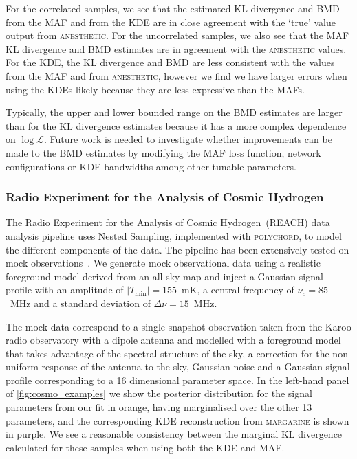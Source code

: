 For the correlated samples, we see that the estimated KL divergence and BMD from the MAF and from the KDE are in close agreement with the `true' value output from \textsc{anesthetic}.
For the uncorrelated samples, we also see that the MAF KL divergence and BMD estimates are in agreement with the \textsc{anesthetic} values. For the KDE, the KL divergence and BMD are less consistent with the values from the MAF and from \textsc{anesthetic}, however we find we have larger errors when using the KDEs likely because they are less expressive than the MAFs. 

Typically, the upper and lower bounded range on the BMD estimates are larger than for the KL divergence estimates because it has a more complex dependence on $\log\mathcal{L}$. Future work is needed to investigate whether improvements can be made to the BMD estimates by modifying the MAF loss function, network configurations or KDE bandwidths among other tunable parameters.

\subsubsection{Radio Experiment for the Analysis of Cosmic Hydrogen}


The Radio Experiment for the Analysis of Cosmic Hydrogen~(REACH)  data analysis pipeline \cite{Anstey_REACH_2021} uses Nested Sampling, implemented with \textsc{polychord}, to model the different components of the data. The pipeline has been extensively tested on mock observations~\citep{Anstey_REACH_2021,Anstey_antenna_2022,Cumner_antenna_2021, Scheutwinkel2022a, Scheutwinkel2022b}. We generate mock observational data using a realistic foreground model derived from an all-sky map and inject a Gaussian signal profile with an amplitude of $|T_\mathrm{min}| = 155$~mK, a central frequency of $\nu_c = 85$~MHz and a standard deviation of $\Delta \nu = 15$~MHz.

The mock data correspond to a single snapshot observation taken from the Karoo radio observatory with a dipole antenna and modelled with a foreground model that takes advantage of the spectral structure of the sky, a correction for the non-uniform response of the antenna to the sky, Gaussian noise and a Gaussian signal profile corresponding to a 16 dimensional parameter space. In the left-hand panel of \cref{fig:cosmo_examples} we show the posterior distribution for the signal parameters from our fit in orange, having marginalised over the other 13 parameters, and the corresponding KDE reconstruction from \textsc{margarine} is shown in purple. We see a reasonable consistency between the marginal KL divergence calculated for these samples when using both the KDE and MAF. 

